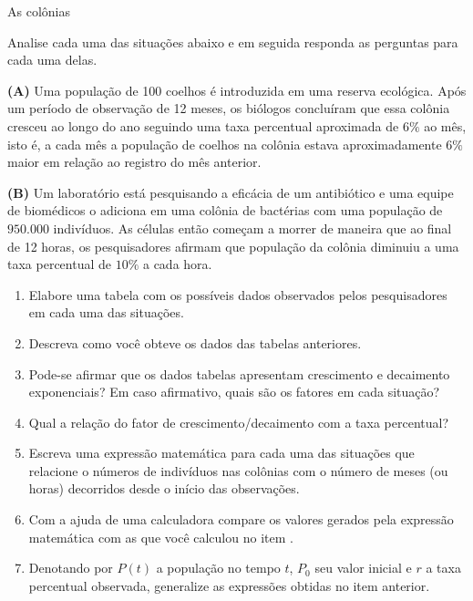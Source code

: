 \begin{task}{As colônias}

Analise cada uma das situações abaixo e em seguida responda as perguntas para cada uma delas.

 \textbf{(A)} Uma população de 100 coelhos é introduzida em uma reserva ecológica. Após um período de observação de 12 meses, os biólogos concluíram que essa colônia cresceu ao longo do ano seguindo uma taxa percentual aproximada de $6\%$ ao mês, isto é, a cada mês a população de coelhos na colônia estava aproximadamente $6\%$ maior em relação ao registro do mês anterior.


 \textbf{(B)} Um laboratório está pesquisando a eficácia de um antibiótico e uma equipe de biomédicos o adiciona em uma colônia de bactérias com uma população de $950.000$ indivíduos. As células então começam a morrer de maneira que ao final de 12 horas, os pesquisadores afirmam que população da colônia diminuiu a uma taxa percentual de $10\%$ a cada hora.

\begin{enumerate}

\item{}
Elabore uma tabela com os possíveis dados observados pelos pesquisadores em cada uma das situações.
\item{}
Descreva como você obteve os dados das tabelas anteriores.
\item{}
Pode-se afirmar que os dados tabelas apresentam crescimento e decaimento exponenciais? Em caso afirmativo, quais são os fatores em cada situação?
\item{}
Qual a relação do fator de crescimento/decaimento com a taxa percentual?
\item{}
Escreva uma expressão matemática para cada uma das situações que relacione o números de indivíduos nas colônias com o número de meses (ou horas) decorridos desde o início das observações.
\item{}
Com a ajuda de uma calculadora compare os valores gerados pela expressão matemática com as que você calculou no item .
\item{}
Denotando por $P(t)$ a população no tempo $t$, $P_0$ seu valor inicial e $r$ a taxa percentual observada, generalize as expressões obtidas no item anterior.
\end{enumerate}

\end{task}



